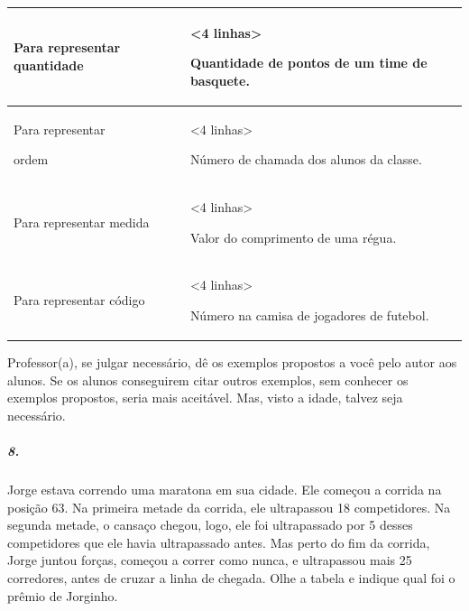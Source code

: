 \begin{longtable}[]{@{}ll@{}}
\toprule
\begin{minipage}[b]{0.48\columnwidth}\raggedright\strut
Para representar quantidade\strut
\end{minipage} & \begin{minipage}[b]{0.48\columnwidth}\raggedright\strut
\textless{}4 linhas\textgreater{}

Quantidade de pontos de um time de basquete.\strut
\end{minipage}\tabularnewline
\midrule
\endhead
\begin{minipage}[t]{0.48\columnwidth}\raggedright\strut
Para representar

ordem\strut
\end{minipage} & \begin{minipage}[t]{0.48\columnwidth}\raggedright\strut
\textless{}4 linhas\textgreater{}

Número de chamada dos alunos da classe.\strut
\end{minipage}\tabularnewline
\begin{minipage}[t]{0.48\columnwidth}\raggedright\strut
Para representar medida\strut
\end{minipage} & \begin{minipage}[t]{0.48\columnwidth}\raggedright\strut
\textless{}4 linhas\textgreater{}

Valor do comprimento de uma régua.\strut
\end{minipage}\tabularnewline
\begin{minipage}[t]{0.48\columnwidth}\raggedright\strut
Para representar código\strut
\end{minipage} & \begin{minipage}[t]{0.48\columnwidth}\raggedright\strut
\textless{}4 linhas\textgreater{}

Número na camisa de jogadores de futebol.\strut
\end{minipage}\tabularnewline
\bottomrule
\end{longtable}

Professor(a), se julgar necessário, dê os exemplos propostos a você pelo
autor aos alunos. Se os alunos conseguirem citar outros exemplos, sem
conhecer os exemplos propostos, seria mais aceitável. Mas, visto a
idade, talvez seja necessário.

\subparagraph{8. }\label{section-7}

Jorge estava correndo uma maratona em sua cidade. Ele começou a corrida
na posição 63. Na primeira metade da corrida, ele ultrapassou 18
competidores. Na segunda metade, o cansaço chegou, logo, ele foi
ultrapassado por 5 desses competidores que ele havia ultrapassado antes.
Mas perto do fim da corrida, Jorge juntou forças, começou a correr como
nunca, e ultrapassou mais 25 corredores, antes de cruzar a linha de
chegada. Olhe a tabela e indique qual foi o prêmio de Jorginho.

